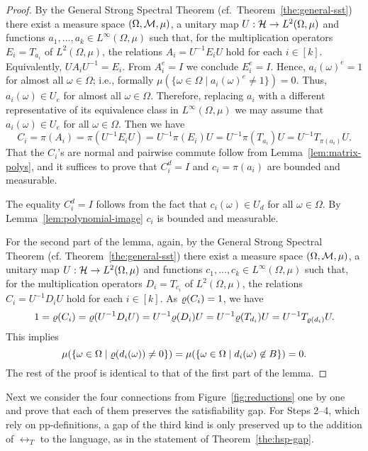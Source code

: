 \begin{proof}
By the General Strong Spectral Theorem (cf.~Theorem~\ref{the:general-sst}) there exist a measure space $(\Omega,{\mathcal M},\mu)$, a unitary map $U:{\mathcal H}\to L^2(\Omega,\mu)$ and functions $a_1,\dots,a_k\in L^\infty(\Omega,\mu)$ such
that, for the multiplication operators $E_i = T_{a_i}$ of $L^2(\Omega,\mu)$, the relations $A_i = U^{-1} E_iU$ hold for each $i\in [k]$. Equivalently,
$U A_iU^{-1} = E_i$. From $A_i^e=I$ we conclude $E_i^e=I$. Hence, $a_i(\omega)^e = 1$ for almost all $\omega\in\Omega$; i.e., formally $\mu(\{\omega\in\Omega\mid a_i(\omega)^e\ne1\}) = 0$. Thus, $a_i(\omega)\in U_e$ for almost all $\omega\in\Omega$. Therefore, replacing $a_i$ with a different representative of its equivalence class in $L^\infty(\Omega,\mu)$ we may assume that $a_i(\omega)\in U_e$ for all $\omega\in\Omega$. Then we have 
\[
C_i=\pi(A_i)=\pi(U^{-1}E_iU)=U^{-1}\pi(E_i)U=U^{-1}\pi(T_{a_i})U=U^{-1}T_{\pi(a_i)}U.
\]
That the $C_i$'s are normal and pairwise commute follow from Lemma~\ref{lem:matrix-polys}, and it suffices to prove that $C^d_i=I$ and $c_i=\pi(a_i)$ are bounded and measurable.

The equality $C^d_i=I$ follows from the fact that $c_i(\omega)\in U_d$ for all $\omega\in\Omega$. By Lemma~\ref{lem:polynomial-image} $c_i$ is bounded and measurable. 

For the second part of the lemma, again, by the General Strong Spectral Theorem (cf. Theorem~\ref{the:general-sst}) there exist a measure space $(\Omega,{\mathcal M},\mu)$, a unitary map $U:{\mathcal H}\to L^2(\Omega,\mu)$ and functions $c_1,\dots,c_k\in L^\infty(\Omega,\mu)$ such
that, for the multiplication operators $D_i = T_{c_i}$ of $L^2(\Omega,\mu)$, the relations $C_i = U^{-1} D_iU$ hold for each $i\in [k]$. As $\varrho(C_i)=1$, we have 
\[
1=\varrho(C_i)=\varrho(U^{-1}D_iU)=U^{-1}\varrho(D_i)U=U^{-1}\varrho(T_{d_i})U=U^{-1}T_{\varrho(d_i)}U.
\]
This implies 
\[
\mu(\{\omega\in\Omega\mid \varrho(d_i(\omega))\ne0\})=\mu(\{\omega\in\Omega\mid d_i(\omega)\not\in B\}) = 0.
\]
The rest of the proof is identical to that of the first part of the lemma.
\end{proof}


Next we consider the four connections from Figure~\ref{fig:reductions} one by
one and prove that each of them preserves the satisfiability gap. For Steps
2--4, which rely on pp-definitions, a gap of the third kind is only preserved up
to the addition of $\rel_T$ to the language, as in the statement of
Theorem~\ref{the:hsp-gap}.

\smallskip

